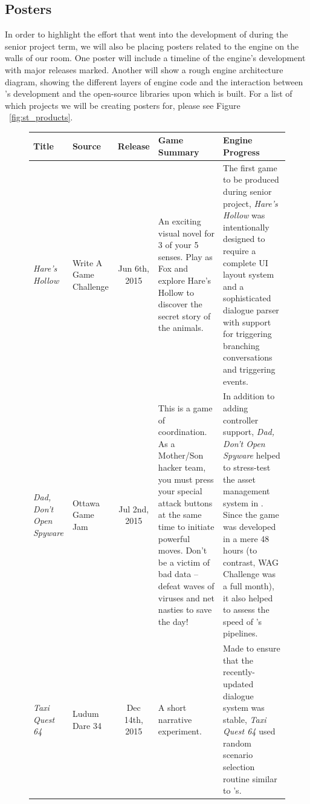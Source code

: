 \documentclass{GlobalDocument}
\begin{document}
\subsection{\ourengine{} Posters}
In order to highlight the effort that went into the development of \ourengine{} during the senior project term, we will also be placing posters related to the engine on the walls of our room. One poster will include a timeline of the engine's development with major releases marked. Another will show a rough engine architecture diagram, showing the different layers of engine code and the interaction between \ourteam{}'s development and the open-source libraries upon which \ourengine{} is built. For a list of which projects we will be creating posters for, please see Figure ~\ref{fig:st_products}.

\begin{figure}[htb]
\centering
    \begin{tabular}{ | p{3cm} | p{3cm} | c | p{5.5cm} | p{6cm} |}
    \hline
    Title & Source & Release & Game Summary & Engine Progress \\ \hline
    
    \textit{Hare's Hollow}&
    Write A Game Challenge&
    Jun 6th, 2015&
    An exciting visual novel for 3 of your 5 senses. Play as Fox and explore Hare's Hollow to discover the secret story of the animals.&
    The first game to be produced during senior project, \textit{Hare's Hollow} was intentionally designed to require a complete UI layout system and a sophisticated dialogue parser with support for triggering branching conversations and triggering events.\\ \hline
    
    \textit{Dad, Don't Open Spyware}&
    Ottawa Game Jam&
    Jul 2nd, 2015&
    This is a game of coordination. As a Mother/Son hacker team, you must press your special attack buttons at the same time to initiate powerful moves. Don't be a victim of bad data -- defeat waves of viruses and net nasties to save the day!&
    In addition to adding controller support, \textit{Dad, Don't Open Spyware} helped to stress-test the asset management system in \ourengine{}. Since the game was developed in a mere 48 hours (to contrast, WAG Challenge was a full month), it also helped to assess the speed of \ourteam{}'s pipelines.\\ \hline
    
    \textit{Taxi Quest 64}&
    Ludum Dare 34 &
    Dec 14th, 2015&
    A short narrative experiment.&
    Made to ensure that the recently-updated dialogue system was stable, \textit{Taxi Quest 64} used random scenario selection routine similar to \ourgame{}'s.\\ \hline
        

\end{tabular}
\end{figure}
\end{document}
